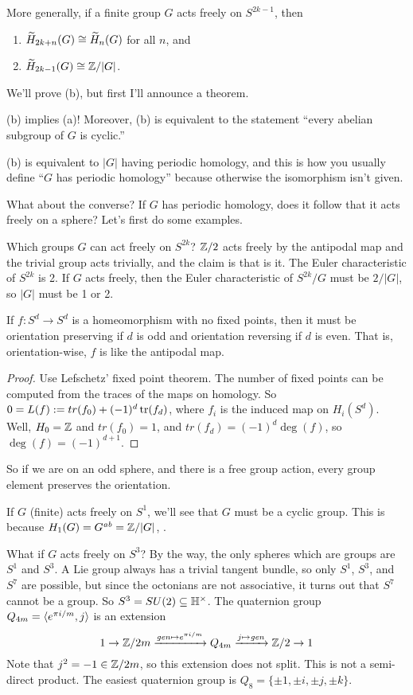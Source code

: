 More generally, if a finite group $G$ acts freely on $S^{2k-1}$, then
\begin{enumerate}
 \item[(a)] $\widetilde{H}_{2k+n}(G)\cong \widetilde{H}_n(G)$ for all $n$, and
 \item[(b)] $\widetilde{H}_{2k-1}(G)\cong \mathbb{Z}/|G|$.
\end{enumerate}
We'll prove (b), but first I'll announce a theorem.
\begin{theorem}
 (b) implies (a)! Moreover, (b) is equivalent to the statement ``every abelian subgroup of $G$ is cyclic.''
\end{theorem}
(b) is equivalent to $|G|$ having periodic homology, and this is how you usually define ``$G$ has periodic homology'' because otherwise the isomorphism isn't given.

What about the converse? If $G$ has periodic homology, does it follow that it acts freely on a sphere? Let's first do some examples.
\begin{example}
 Which groups $G$ can act freely on $S^{2k}$? $\mathbb{Z}/2$ acts freely by the antipodal map and the trivial group acts trivially, and the claim is that is it. The Euler characteristic of $S^{2k}$ is 2. If $G$ acts freely, then the Euler characteristic of $S^{2k}/G$ must be $2/|G|$, so $|G|$ must be 1 or 2.
\end{example}
If $f\colon S^d\to S^d$ is a homeomorphism with no fixed points, then it must be orientation preserving if $d$ is odd and orientation reversing if $d$ is even. That is, orientation-wise, $f$ is like the antipodal map.
\begin{proof}
 Use Lefschetz' fixed point theorem. The number of fixed points can be computed from the traces of the maps on homology. So $0=L(f):= tr(f_0) +(-1)^d \operatorname{tr}(f_d)$, where $f_i$ is the induced map on $H_i(S^d)$. Well, $H_0=\mathbb{Z}$ and $tr(f_0)=1$, and $tr(f_d)=(-1)^d\deg(f)$, so $\deg(f)=(-1)^{d+1}$.
\end{proof}
So if we are on an odd sphere, and there is a free group action, every group element preserves the orientation.

If $G$ (finite) acts freely on $S^1$, we'll see that $G$ must be a cyclic group. This is because $H_1(G)=G^\mathit{ab}=\mathbb{Z}/|G|$, .

What if $G$ acts freely on $S^3$? By the way, the only spheres which are groups are $S^1$ and $S^3$. A Lie group always has a trivial tangent bundle, so only $S^1$, $S^3$, and $S^7$ are possible, but since the octonians are not associative, it turns out that $S^7$ cannot be a group. So $S^3=SU(2)\subseteq \mathbb{H}^\times$. The quaternion group $Q_{4m}=\langle e^{\pi i/m},j\rangle$ is an extension
\[
 1\to \mathbb{Z}/2m\xrightarrow{\mathit{gen}\mapsto e^{\pi i/m}} Q_{4m}\xrightarrow{j\mapsto \mathit{gen}} \mathbb{Z}/2\to 1
\]
Note that $j^2=-1\in \mathbb{Z}/2m$, so this extension does not split. This is not a semi-direct product. The easiest quaternion group is $Q_8=\{\pm 1,\pm i,\pm j,\pm k\}$.

